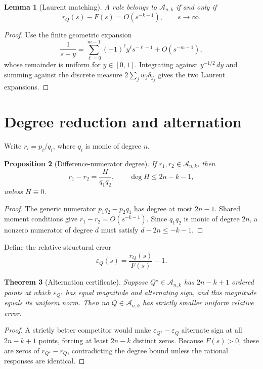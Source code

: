 \documentclass[preprint,12pt]{elsarticle}
\newtheorem{theorem}{Theorem}
\newtheorem{proposition}[theorem]{Proposition}
\newtheorem{lemma}[theorem]{Lemma}
\theoremstyle{remark}
\begin{document}
\begin{lemma}[Laurent matching]
A rule belongs to \(\mathcal A_{n,k}\) if and only if
\[
r_Q(s)-F(s)=O(s^{-k-1}),\qquad s\to\infty.
\]
\end{lemma}

\begin{proof}
Use the finite geometric expansion
\[
\frac{1}{s+y}
=\sum_{\ell=0}^{m-1}(-1)^\ell y^\ell s^{-\ell-1}
+O(s^{-m-1}),
\]
whose remainder is uniform for \(y\in[0,1]\). Integrating against
\(y^{-1/2}\,dy\) and summing against the discrete measure
\(2\sum_jw_j\delta_{y_j}\) gives the two Laurent expansions.
\end{proof}

\section{Degree reduction and alternation}

Write \(r_i=p_i/q_i\), where \(q_i\) is monic of degree \(n\).

\begin{proposition}[Difference-numerator degree]
If \(r_1,r_2\in\mathcal A_{n,k}\), then
\[
r_1-r_2=\frac{H}{q_1q_2},\qquad
\deg H\leq 2n-k-1,
\]
unless \(H\equiv0\).
\end{proposition}

\begin{proof}
The generic numerator \(p_1q_2-p_2q_1\) has degree at most \(2n-1\).
Shared moment conditions give \(r_1-r_2=O(s^{-k-1})\). Since \(q_1q_2\)
is monic of degree \(2n\), a nonzero numerator of degree \(d\) must
satisfy \(d-2n\leq-k-1\).
\end{proof}

Define the relative structural error
\[
\varepsilon_Q(s)=\frac{r_Q(s)}{F(s)}-1.
\]

\begin{theorem}[Alternation certificate]
Suppose \(Q^\star\in\mathcal A_{n,k}\) has \(2n-k+1\) ordered points
at which \(\varepsilon_{Q^\star}\) has equal magnitude and alternating
sign, and this magnitude equals its uniform norm. Then no
\(Q\in\mathcal A_{n,k}\) has strictly smaller uniform relative error.
\end{theorem}

\begin{proof}
A strictly better competitor would make
\(\varepsilon_{Q^\star}-\varepsilon_Q\) alternate sign at all
\(2n-k+1\) points, forcing at least \(2n-k\) distinct zeros. Because
\(F(s)>0\), these are zeros of \(r_{Q^\star}-r_Q\), contradicting the
degree bound unless the rational responses are identical.
\end{proof}
\end{document}
